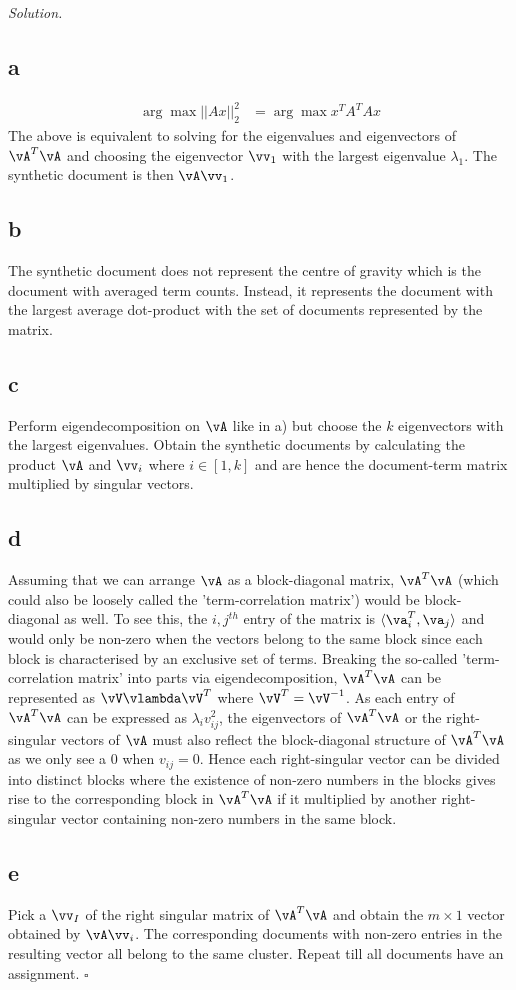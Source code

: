 \documentclass[11pt]{article}
\theoremstyle{definition}
\newenvironment{solution}{\noindent\emph{Solution.}}{\hfill$\square$}
\begin{document}
\begin{solution}
\subsection*{a}
\begin{align*}
\arg \max ||Ax||_2^2
&= \arg \max x^T A^T A x 
\end{align*}
The above is equivalent to solving for the eigenvalues and eigenvectors of $\vA^T \vA$ and choosing the eigenvector $\vv_1$ with the largest eigenvalue $\lambda_1$. The synthetic document is then $\vA\vv_1$.
\subsection*{b}
The synthetic document does not represent the centre of gravity which is the document with averaged term counts. Instead, it represents the document with the largest average dot-product with the set of documents represented by the matrix.
\subsection*{c}
Perform eigendecomposition on $\vA$ like in a) but choose the $k$ eigenvectors with the largest eigenvalues. Obtain the synthetic documents by calculating the product $\vA$ and $\vv_i$ where $i \in [1, k]$ and are hence the document-term matrix multiplied by singular vectors.
\subsection*{d}
Assuming that we can arrange $\vA$ as a block-diagonal matrix, $\vA^T \vA$ (which could also be loosely called the 'term-correlation matrix') would be block-diagonal as well. To see this, the $i,j^{th}$ entry of the matrix is $\langle \va_i^T, \va_j \rangle$ and would only be non-zero when the vectors belong to the same block since each block is characterised by an exclusive set of terms. Breaking the so-called 'term-correlation matrix' into parts via eigendecomposition, $\vA^T \vA$ can be represented as $\vV \vlambda \vV^T$ where $\vV^T = \vV^{-1}$. As each entry of $\vA^T \vA$ can be expressed as $\lambda_i v_{ij} ^2$, the eigenvectors of $\vA^T \vA$ or the right-singular vectors of $\vA$ must also reflect the block-diagonal structure of  $\vA^T \vA$ as we only see a 0 when $v_{ij} = 0$. Hence each right-singular vector can be divided into distinct blocks where the existence of non-zero numbers in the blocks gives rise to the corresponding block in $\vA^T \vA$ if it multiplied by another right-singular vector containing non-zero numbers in the same block. 
\subsection*{e}
Pick a $\vv_I$ of the right singular matrix of $\vA^T \vA$ and obtain the $m \times 1$ vector obtained by $\vA \vv_i$. The corresponding documents with non-zero entries in the resulting vector all belong to the same cluster. Repeat till all documents have an assignment.
\end{solution}
\end{document}
